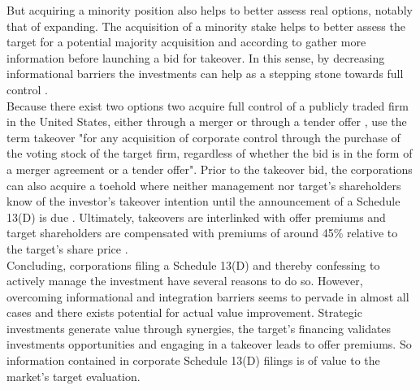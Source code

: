 \documentclass[12pt]{article}
\begin{document}
But acquiring a minority position also helps to better assess real options, notably that of expanding. The acquisition of a minority stake helps to better assess the target for a potential majority acquisition \citep{Ouimet2013} and according to \citet[p.30]{Huang2017} gather more information before launching a bid for takeover. In this sense, by decreasing informational barriers the investments can help as a stepping stone towards full control \citep[p.3]{Huang2017}.\\
Because there exist two options two acquire full control of a publicly traded firm in the United States, either through a merger or through a tender offer \citep[p.2]{Offenberg2015}, \citet[p.1]{Betton2008} use the term takeover "for any acquisition of corporate control through the purchase of the voting stock of the target firm, regardless of whether the bid is in the form of a merger agreement or a tender offer".
Prior to the takeover bid, the corporations can also acquire a toehold where neither management nor target's shareholders know of the investor's takeover intention until the announcement of a Schedule 13(D) is due \citep[p.158]{Eckbo2009}. Ultimately, takeovers are interlinked with offer premiums and target shareholders are compensated with premiums of around 45\% relative to the target's share price \citep[p.154]{Eckbo2009}.\\
Concluding, corporations filing a Schedule 13(D) and thereby confessing to actively manage the investment have several reasons to do so. However, overcoming informational and integration barriers seems to pervade in almost all cases and there exists potential for actual value improvement. Strategic investments generate value through synergies, the target's financing validates investments opportunities and engaging in a takeover leads to offer premiums. So information contained in corporate Schedule 13(D) filings is of value to the market's target evaluation. 
\end{document}
